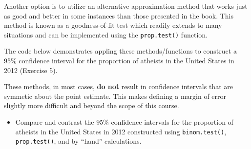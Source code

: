 \documentclass[]{book}
\newenvironment{Shaded}{\begin{snugshade}}{\end{snugshade}}
\newcommand{\KeywordTok}[1]{\textcolor[rgb]{0.13,0.29,0.53}{\textbf{{#1}}}}
\newcommand{\DataTypeTok}[1]{\textcolor[rgb]{0.13,0.29,0.53}{{#1}}}
\newcommand{\StringTok}[1]{\textcolor[rgb]{0.31,0.60,0.02}{{#1}}}
\newcommand{\CommentTok}[1]{\textcolor[rgb]{0.56,0.35,0.01}{\textit{{#1}}}}
\newcommand{\NormalTok}[1]{{#1}}
\providecommand{\tightlist}{%
  \setlength{\itemsep}{0pt}\setlength{\parskip}{0pt}}
\theoremstyle{definition}
\theoremstyle{definition}
\theoremstyle{definition}
\theoremstyle{remark}
\begin{document}
Another option is to utilize an alternative approximation method that
works just as good and better in some instances than those presented in
the book. This method is known as a goodness-of-fit test which readily
extends to many situations and can be implemented using the
\texttt{prop.test()} function.

The code below demonstrates appling these methods/functions to construct
a 95\% confidence interval for the proportion of atheists in the United
States in 2012 (Exercise 5).

\begin{Shaded}
\end{Shaded}

These methods, in most cases, \textbf{do not} result in confidence
intervals that are symmetic about the point estimate. This makes
defining a margin of error slightly more difficult and beyond the scope
of this course.

\begin{itemize}
\tightlist
\item
  Compare and contrast the 95\% confidence intervals for the proportion
  of atheists in the United States in 2012 constructed using
  \texttt{binom.test()}, \texttt{prop.test()}, and by ``hand''
  calculations.
\end{itemize}
\end{document}
